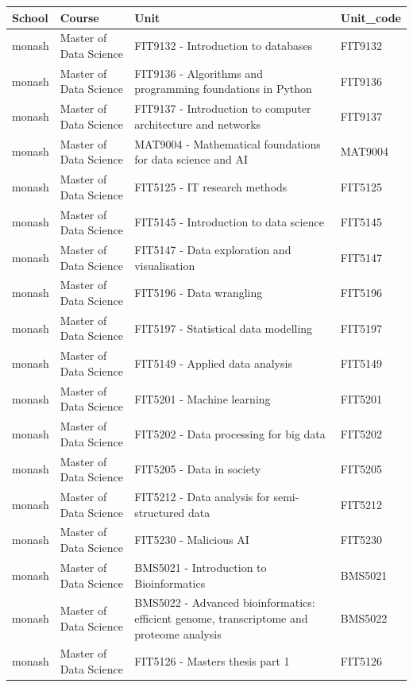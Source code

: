 \documentclass[
  letterpaper,
  DIV=11,
  numbers=noendperiod]{scrreport}
\begin{document}
\begin{table}
\centering
\begin{tabular}{l|l|l|l}
\hline
School & Course & Unit & Unit\_code\\
\hline
monash & Master of Data Science & FIT9132 - Introduction to databases & FIT9132\\
\hline
monash & Master of Data Science & FIT9136 - Algorithms and programming foundations in Python & FIT9136\\
\hline
monash & Master of Data Science & FIT9137 - Introduction to computer architecture and networks & FIT9137\\
\hline
monash & Master of Data Science & MAT9004 - Mathematical foundations for data science and AI & MAT9004\\
\hline
monash & Master of Data Science & FIT5125 - IT research methods & FIT5125\\
\hline
monash & Master of Data Science & FIT5145 - Introduction to data science & FIT5145\\
\hline
monash & Master of Data Science & FIT5147 - Data exploration and visualisation & FIT5147\\
\hline
monash & Master of Data Science & FIT5196 - Data wrangling & FIT5196\\
\hline
monash & Master of Data Science & FIT5197 - Statistical data modelling & FIT5197\\
\hline
monash & Master of Data Science & FIT5149 - Applied data analysis & FIT5149\\
\hline
monash & Master of Data Science & FIT5201 - Machine learning & FIT5201\\
\hline
monash & Master of Data Science & FIT5202 - Data processing for big data & FIT5202\\
\hline
monash & Master of Data Science & FIT5205 - Data in society & FIT5205\\
\hline
monash & Master of Data Science & FIT5212 - Data analysis for semi-structured data & FIT5212\\
\hline
monash & Master of Data Science & FIT5230 - Malicious AI & FIT5230\\
\hline
monash & Master of Data Science & BMS5021 - Introduction to Bioinformatics & BMS5021\\
\hline
monash & Master of Data Science & BMS5022 - Advanced bioinformatics: efficient genome, transcriptome and proteome analysis & BMS5022\\
\hline
monash & Master of Data Science & FIT5126 - Masters thesis part 1 & FIT5126\\

\end{tabular}
\end{table}
\end{document}
